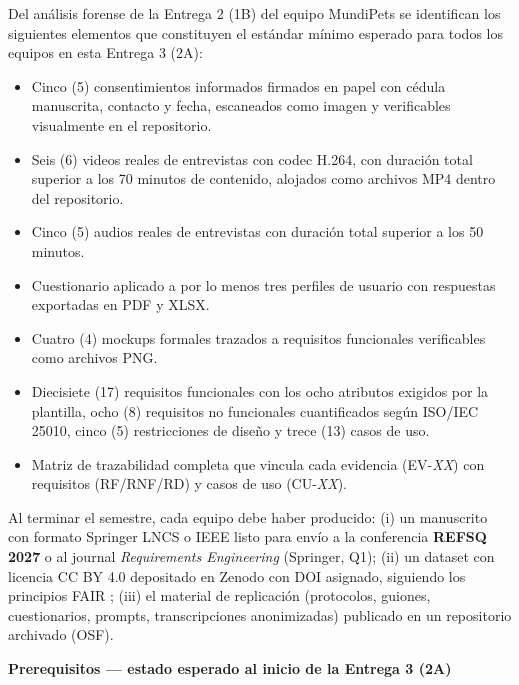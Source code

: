 \documentclass[11pt,a4paper]{article}
\newcounter{secc}
\newcommand{\secband}[1]{%
    \stepcounter{secc}\par\vspace{9pt}\noindent
    {\setlength{\fboxsep}{0pt}%
        \colorbox{uteqgold}{\parbox[c][20pt][c]{0.05\textwidth}{\centering\textbf{\color{white}\small \arabic{secc}}}}%
        \colorbox{uteqgreen}{\parbox[c][20pt][c]{0.95\textwidth}{\hspace{8pt}\textbf{\color{white}\small #1}}}%
    }\par\vspace{5pt}}
\begin{document}
\begin{notabox}[title=Línea base tomada de la mejor Entrega 2 (1B) --- proyecto MundiPets]
Del análisis forense de la Entrega 2 (1B) del equipo MundiPets se identifican los siguientes elementos que constituyen el estándar mínimo esperado para todos los equipos en esta Entrega 3 (2A):
\begin{itemize}
    \item Cinco (5) consentimientos informados firmados en papel con cédula manuscrita, contacto y fecha, escaneados como imagen y verificables visualmente en el repositorio.
    \item Seis (6) videos reales de entrevistas con codec H.264, con duración total superior a los 70 minutos de contenido, alojados como archivos MP4 dentro del repositorio.
    \item Cinco (5) audios reales de entrevistas con duración total superior a los 50 minutos.
    \item Cuestionario aplicado a por lo menos tres perfiles de usuario con respuestas exportadas en PDF y XLSX.
    \item Cuatro (4) mockups formales trazados a requisitos funcionales verificables como archivos PNG.
    \item Diecisiete (17) requisitos funcionales con los ocho atributos exigidos por la plantilla, ocho (8) requisitos no funcionales cuantificados según ISO/IEC 25010, cinco (5) restricciones de diseño y trece (13) casos de uso.
    \item Matriz de trazabilidad completa que vincula cada evidencia (EV-\emph{XX}) con requisitos (RF/RNF/RD) y casos de uso (CU-\emph{XX}).
\end{itemize}
\end{notabox}

\begin{pubbox}[title=Objetivo terminal (Entrega 4): publicación de alto impacto]
Al terminar el semestre, cada equipo debe haber producido: (i) un manuscrito con formato Springer LNCS o IEEE listo para envío a la conferencia \textbf{REFSQ 2027} o al journal \textit{Requirements Engineering} (Springer, Q1); (ii) un dataset con licencia CC BY 4.0 depositado en Zenodo con DOI asignado, siguiendo los principios FAIR \cite{wilkinson2016fair}; (iii) el material de replicación (protocolos, guiones, cuestionarios, prompts, transcripciones anonimizadas) publicado en un repositorio archivado (OSF).
\end{pubbox}

\secband{Prerequisitos --- estado esperado al inicio de la Entrega 3 (2A)}
\end{document}
